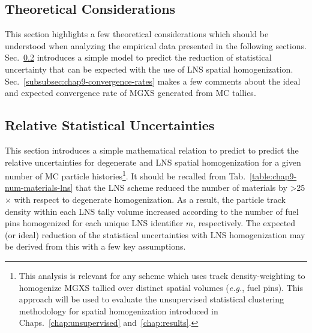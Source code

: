 \subsection{Theoretical Considerations}
\label{subsec:chap9-theory}

This section highlights a few theoretical considerations which should be understood when analyzing the empirical data presented in the following sections. Sec.~\ref{subsubsec:chap9-relative-uncertainties} introduces a simple model to predict the reduction of statistical uncertainty that can be expected with the use of \ac{LNS} spatial homogenization. Sec.~\ref{subsubsec:chap9-convergence-rates} makes a few comments about the ideal and expected convergence rate of \ac{MGXS} generated from \ac{MC} tallies.

\subsection{Relative Statistical Uncertainties}
\label{subsubsec:chap9-relative-uncertainties}

This section introduces a simple mathematical relation to predict to predict the relative uncertainties for degenerate and \ac{LNS} spatial homogenization for a given number of \ac{MC} particle histories\footnote{This analysis is relevant for any scheme which uses track density-weighting to homogenize \ac{MGXS} tallied over distinct spatial volumes (\textit{e.g.}, fuel pins). This approach will be used to evaluate the unsupervised statistical clustering methodology for spatial homogenization introduced in Chaps.~\ref{chap:unsupervised} and~\ref{chap:results}.}. It should be recalled from Tab.~\ref{table:chap9-num-materials-lns} that the \ac{LNS} scheme reduced the number of materials by >25$\times$ with respect to degenerate homogenization. As a result, the particle track density within each \ac{LNS} tally volume increased according to the number of fuel pins homogenized for each unique \ac{LNS} identifier $m$, respectively. The expected (or ideal) reduction of the statistical uncertainties with \ac{LNS} homogenization may be derived from this with a few key assumptions. 

